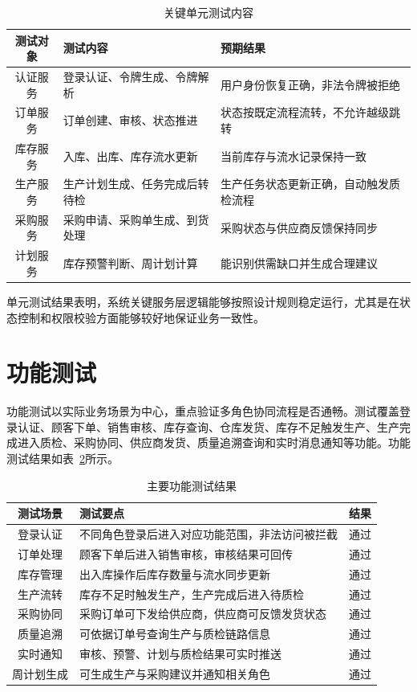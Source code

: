 \begin{table}[htbp]
\centering
\footnotesize
\caption{关键单元测试内容}
\label{tab:unit-test}
\begin{tabular}{|c|p{4.8cm}|p{5.4cm}|}
\hline
测试对象 & 测试内容 & 预期结果 \\\hline
认证服务 & 登录认证、令牌生成、令牌解析 & 用户身份恢复正确，非法令牌被拒绝 \\\hline
订单服务 & 订单创建、审核、状态推进 & 状态按既定流程流转，不允许越级跳转 \\\hline
库存服务 & 入库、出库、库存流水更新 & 当前库存与流水记录保持一致 \\\hline
生产服务 & 生产计划生成、任务完成后转待检 & 生产任务状态更新正确，自动触发质检流程 \\\hline
采购服务 & 采购申请、采购单生成、到货处理 & 采购状态与供应商反馈保持同步 \\\hline
计划服务 & 库存预警判断、周计划计算 & 能识别供需缺口并生成合理建议 \\\hline
\end{tabular}
\end{table}

单元测试结果表明，系统关键服务层逻辑能够按照设计规则稳定运行，尤其是在状态控制和权限校验方面能够较好地保证业务一致性。

\section{功能测试}

功能测试以实际业务场景为中心，重点验证多角色协同流程是否通畅。测试覆盖登录认证、顾客下单、销售审核、库存查询、仓库发货、库存不足触发生产、生产完成进入质检、采购协同、供应商发货、质量追溯查询和实时消息通知等功能。功能测试结果如表~\ref{tab:function-test}所示。

\begin{table}[htbp]
\centering
\footnotesize
\caption{主要功能测试结果}
\label{tab:function-test}
\begin{tabular}{|c|p{5.2cm}|c|}
\hline
测试场景 & 测试要点 & 结果 \\\hline
登录认证 & 不同角色登录后进入对应功能范围，非法访问被拦截 & 通过 \\\hline
订单处理 & 顾客下单后进入销售审核，审核结果可回传 & 通过 \\\hline
库存管理 & 出入库操作后库存数量与流水同步更新 & 通过 \\\hline
生产流转 & 库存不足时触发生产，生产完成后进入待质检 & 通过 \\\hline
采购协同 & 采购订单可下发给供应商，供应商可反馈发货状态 & 通过 \\\hline
质量追溯 & 可依据订单号查询生产与质检链路信息 & 通过 \\\hline
实时通知 & 审核、预警、计划与质检结果可实时推送 & 通过 \\\hline
周计划生成 & 可生成生产与采购建议并通知相关角色 & 通过 \\\hline
\end{tabular}
\end{table}

